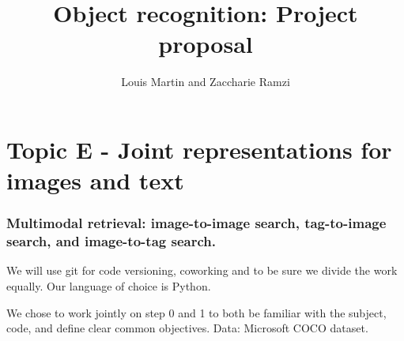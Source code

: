 \documentclass[a4paper,12pt]{article}
\let\oldsection\section
\renewcommand\section{\clearpage\oldsection}
\begin{document}
\title{Object recognition: Project proposal}
\author{Louis Martin and Zaccharie Ramzi}

\maketitle
\pagebreak

\section*{Topic E - Joint representations for images and text}
\subsubsection*{Multimodal retrieval: image-to-image search, tag-to-image search,
and image-to-tag search.}


We will use git for code versioning, coworking and to be sure we divide the work
equally. Our language of choice is Python.

We chose to work jointly on step 0 and 1 to both be familiar with the subject,
code, and define clear common objectives.
Data: Microsoft COCO dataset.
\end{document}
